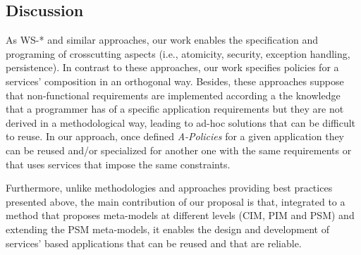 \subsection{Discussion}
As WS-*  and similar approaches, our work enables the specification and programing of  crosscutting aspects (i.e., atomicity, security, exception handling, persistence). In contrast to these approaches, our work specifies policies for a services' composition in an orthogonal way. Besides, these approaches suppose that non-functional requirements are implemented according a the knowledge that a programmer has of a specific application requirements but they are not derived in a methodological way, leading to ad-hoc solutions that can be difficult to reuse. In our approach, once defined {\em A-Policies} for a given application they can be reused and/or specialized for another one with the same requirements or that uses services that impose the same constraints. 

Furthermore, unlike methodologies and approaches providing best practices presented above, the main contribution of our proposal is that, integrated to a method that proposes meta-models at different levels (CIM, PIM and PSM) and extending the PSM meta-models, it enables  the design and development of services' based applications that can be reused and that are reliable. 
